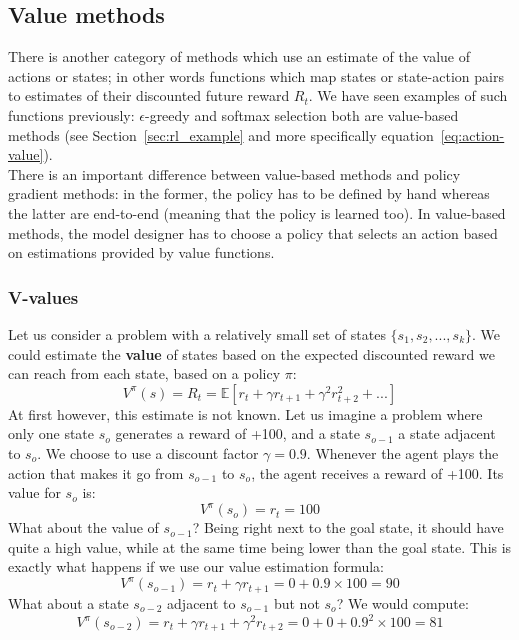 \subsection{Value methods}
There is another category of methods which use an estimate of the value of
actions or states; in other words functions which map states or state-action
pairs to estimates of their discounted future reward $R_t$. We have seen
examples of such functions previously: $\epsilon$-greedy and softmax
selection both are value-based methods (see Section~\ref{sec:rl_example} and
more specifically equation~\ref{eq:action-value}).\\

There is an important
difference between value-based methods and policy gradient methods: in the
former, the policy has to be defined by hand whereas the latter are
end-to-end (meaning that the policy is learned too). In value-based methods,
the model designer has to choose a policy that selects an action based
on estimations provided by value functions.\\

\subsubsection{V-values} 
Let us consider a problem with a relatively small set of states 
$\{s_1, s_2, ..., s_k\}$. We could estimate the \textbf{value} of 
states based on the expected discounted reward we can reach from each state, 
based on a policy $\pi$: 
$$ V^\pi(s) = R_t = \mathbb{E}
   \left[ r_t + \gamma r_{t+1} + \gamma^2 r_{t+2}^2 + ...  \right]$$
At first however, this estimate is not known. Let us imagine a problem where
only one state $s_o$ generates a reward of +100, and a state $s_{o-1}$ a state
adjacent to $s_o$. We choose to use a discount factor $\gamma = 0.9$. 
Whenever the agent plays the action that makes it go from
$s_{o-1}$ to $s_o$, the agent receives a reward of +100. Its value for $s_o$ is:
$$V^\pi(s_o) = r_t = 100$$
What about the value of $s_{o-1}$? Being right next to the goal state, it should
have quite a high value, while at the same time being lower than the goal state.
This is exactly what happens if we use our value estimation formula:
$$V^\pi(s_{o-1}) = r_t + \gamma r_{t+1} = 0+ 0.9 \times 100 = 90$$
What about a state $s_{o-2}$ adjacent to $s_{o-1}$ but not $s_{o}$? We would
compute:
$$V^\pi(s_{o-2}) = r_t + \gamma r_{t+1} + \gamma^2 r_{t+2} = 0+ 0 + 0.9^2 \times 100 = 81$$

